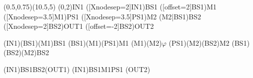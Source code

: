 \documentclass[pstricks]{standalone}
\begin{document}
	\begin{pspicture}(0.5,0.75)(10.5,5)
        \pnode(0,2){IN1}
        \pnode([Xnodesep=2]IN1){BS1}
        \pnode([offset=2]BS1){M1}
        \pnode([Xnodesep=3.5]M1){PS1}
        \pnode([Xnodesep=3.5]PS1){M2}
        \pnode(M2|BS1){BS2}
        \pnode([Xnodesep=2]BS2){OUT1}
        \pnode([offset=-2]BS2){OUT2}
        \begin{optexp}
            \beamsplitter[compname=BS1, labelangle=-90, labeloffset=0.8](IN1)(BS1)(M1){BS1}
            \mirror[compname=M1, labeloffset=0.6](BS1)(M1)(PS1){M1}
            \optbox[compname=PS1, innerlabel, optboxsize=1.0 0.8](M1)(M2){$\varphi$}
            \mirror[compname=M2, labeloffset=0.6](PS1)(M2)(BS2){M2}
            \beamsplitter[compname=BS2, labelangle=-45, labeloffset=1](BS1)(BS2)(M2){BS2}

			\drawbeam(IN1){BS1}{BS2}(OUT1)
			\drawbeam(IN1){BS1}{M1}{PS1}
			(OUT2)
        \end{optexp}
    \end{pspicture}
\end{document}
